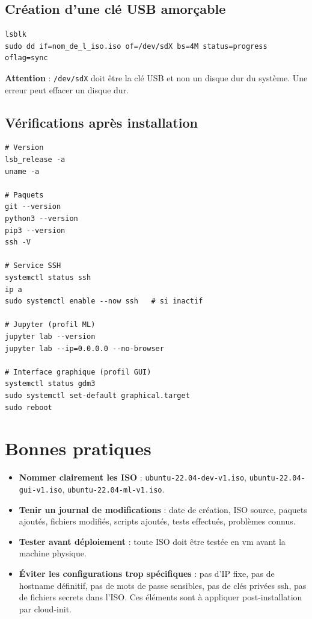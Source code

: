 \subsection{Création d'une clé USB amorçable}

\begin{lstlisting}[basicstyle=\ttfamily\footnotesize, frame=single]
lsblk
sudo dd if=nom_de_l_iso.iso of=/dev/sdX bs=4M status=progress oflag=sync
\end{lstlisting}

\textbf{Attention} : \texttt{/dev/sdX} doit être la clé USB et non un disque dur du système. Une erreur peut effacer un disque dur.

\subsection{Vérifications après installation}

\begin{lstlisting}[basicstyle=\ttfamily\footnotesize, frame=single]
# Version
lsb_release -a
uname -a

# Paquets
git --version
python3 --version
pip3 --version
ssh -V

# Service SSH
systemctl status ssh
ip a
sudo systemctl enable --now ssh   # si inactif

# Jupyter (profil ML)
jupyter lab --version
jupyter lab --ip=0.0.0.0 --no-browser

# Interface graphique (profil GUI)
systemctl status gdm3
sudo systemctl set-default graphical.target
sudo reboot
\end{lstlisting}

\section{Bonnes pratiques}

\begin{itemize}[leftmargin=*]
    \item \textbf{Nommer clairement les ISO} : \texttt{ubuntu-22.04-dev-v1.iso}, \texttt{ubuntu-22.04-gui-v1.iso}, \texttt{ubuntu-22.04-ml-v1.iso}.
    \item \textbf{Tenir un journal de modifications} : date de création, ISO source, paquets ajoutés, fichiers modifiés, scripts ajoutés, tests effectués, problèmes connus.
    \item \textbf{Tester avant déploiement} : toute ISO doit être testée en \acrshort{vm} avant la machine physique.
    \item \textbf{Éviter les configurations trop spécifiques} : pas d'IP fixe, pas de hostname définitif, pas de mots de passe sensibles, pas de clés privées \acrshort{ssh}, pas de fichiers secrets dans l'ISO. Ces éléments sont à appliquer post-installation par cloud-init.
\end{itemize}

